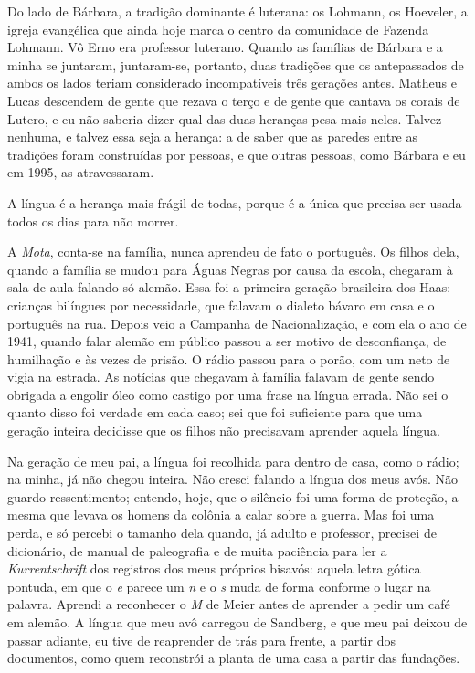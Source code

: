 \documentclass[
  brazilian,
  11pt,
  openany]{book}
\begin{document}
Do lado de Bárbara, a tradição dominante é luterana: os Lohmann, os
Hoeveler, a igreja evangélica que ainda hoje marca o centro da
comunidade de Fazenda Lohmann. Vô Erno era professor luterano. Quando as
famílias de Bárbara e a minha se juntaram, juntaram-se, portanto, duas
tradições que os antepassados de ambos os lados teriam considerado
incompatíveis três gerações antes. Matheus e Lucas descendem de gente
que rezava o terço e de gente que cantava os corais de Lutero, e eu não
saberia dizer qual das duas heranças pesa mais neles. Talvez nenhuma, e
talvez essa seja a herança: a de saber que as paredes entre as tradições
foram construídas por pessoas, e que outras pessoas, como Bárbara e eu
em 1995, as atravessaram.

A língua é a herança mais frágil de todas, porque é a única que precisa
ser usada todos os dias para não morrer.

A \emph{Mota}, conta-se na família, nunca aprendeu de fato o português.
Os filhos dela, quando a família se mudou para Águas Negras por causa da
escola, chegaram à sala de aula falando só alemão. Essa foi a primeira
geração brasileira dos Haas: crianças bilíngues por necessidade, que
falavam o dialeto bávaro em casa e o português na rua. Depois veio a
Campanha de Nacionalização, e com ela o ano de 1941, quando falar alemão
em público passou a ser motivo de desconfiança, de humilhação e às vezes
de prisão. O rádio passou para o porão, com um neto de vigia na estrada.
As notícias que chegavam à família falavam de gente sendo obrigada a
engolir óleo como castigo por uma frase na língua errada. Não sei o
quanto disso foi verdade em cada caso; sei que foi suficiente para que
uma geração inteira decidisse que os filhos não precisavam aprender
aquela língua.

Na geração de meu pai, a língua foi recolhida para dentro de casa, como
o rádio; na minha, já não chegou inteira. Não cresci falando a língua
dos meus avós. Não guardo ressentimento; entendo, hoje, que o silêncio
foi uma forma de proteção, a mesma que levava os homens da colônia a
calar sobre a guerra. Mas foi uma perda, e só percebi o tamanho dela
quando, já adulto e professor, precisei de dicionário, de manual de
paleografia e de muita paciência para ler a \emph{Kurrentschrift} dos
registros dos meus próprios bisavós: aquela letra gótica pontuda, em que
o \emph{e} parece um \emph{n} e o \emph{s} muda de forma conforme o
lugar na palavra. Aprendi a reconhecer o \emph{M} de Meier antes de
aprender a pedir um café em alemão. A língua que meu avô carregou de
Sandberg, e que meu pai deixou de passar adiante, eu tive de reaprender
de trás para frente, a partir dos documentos, como quem reconstrói a
planta de uma casa a partir das fundações.
\end{document}
